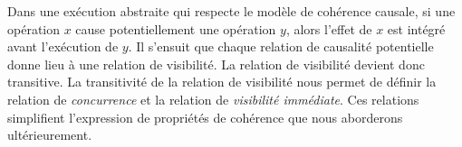 Dans une exécution abstraite qui respecte le modèle de cohérence causale, si une opération $x$ cause potentiellement une opération $y$, alors l'effet de $x$ est intégré avant l'exécution de $y$.
Il s'ensuit que chaque relation de causalité potentielle donne lieu à une relation de visibilité.
La relation de visibilité devient donc transitive.
La transitivité de la relation de visibilité nous permet de définir la relation de \emph{concurrence} et la relation de \emph{visibilité immédiate}.
Ces relations simplifient l'expression de propriétés de cohérence que nous aborderons ultérieurement.





